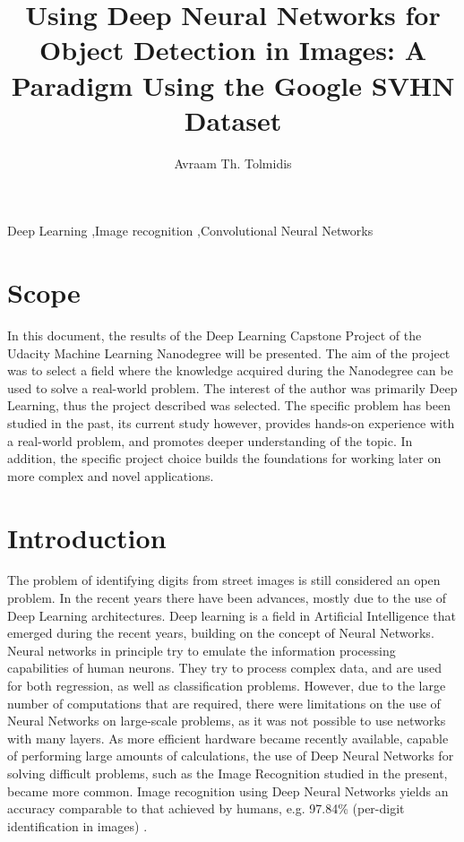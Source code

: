 \documentclass[final,12p,times]{elsarticle}
\begin{document}
\begin{frontmatter}
\title{Using Deep Neural Networks for Object Detection in Images: A Paradigm Using the Google SVHN Dataset}
\author[rvt]{Avraam Th. Tolmidis}


\begin{keyword}
Deep Learning \sep Image recognition \sep Convolutional Neural Networks 
\end{keyword}
\end{frontmatter}
\makenomenclature

\section{Scope}
In this document, the results of the Deep Learning Capstone Project of the Udacity Machine Learning Nanodegree will be presented.
The aim of the project was to select a field where the knowledge acquired during the Nanodegree can be used to solve a real-world problem.
The interest of the author was primarily Deep Learning, thus the project described was selected.
The specific problem has been studied in the past, its current study however, provides hands-on experience with a real-world problem, 
and promotes deeper understanding of the topic.
In addition, the specific project choice builds the foundations for working later on more complex and novel applications.

\section{Introduction}
\label{Intro}
The problem of identifying digits from street images is still considered an open problem.
In the recent years there have been advances, mostly due to the use of Deep Learning architectures.
Deep learning is a field in Artificial Intelligence that emerged during the recent years, building on the concept of Neural Networks.
Neural networks in principle try to emulate the information processing capabilities of human neurons.
They try to process complex data, and are used for both regression, as well as classification problems. 
However, due to the large number of computations that are required, there were limitations on the use of Neural Networks on large-scale 
problems, as it was not possible to use networks with many layers.
As more efficient hardware became recently available, capable of performing large amounts of calculations, the use of Deep Neural Networks 
for solving difficult problems, such as the Image Recognition studied in the present, became more common.
Image recognition using Deep Neural Networks yields an accuracy comparable to that achieved by humans, e.g. 97.84\% (per-digit identification in images) \cite{DBLP:journals/corr/GoodfellowBIAS13}.
\end{document}
